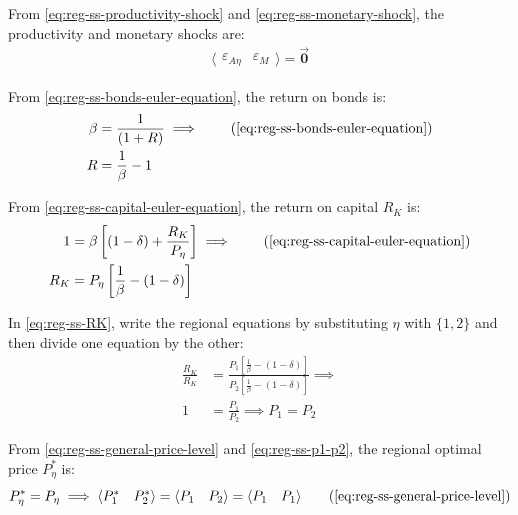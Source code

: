 \documentclass[
thesis.tex
]{subfiles}
\begin{document}
	From \ref{eq:reg-ss-productivity-shock} and \ref{eq:reg-ss-monetary-shock}, the productivity and monetary shocks are:
	\begin{align}
		\langle \begin{matrix} \varepsilon_{A\eta} & \varepsilon_{M} \end{matrix} \rangle = \vec{\bm{0}} \label{eq:reg-ss-epsilon}
	\end{align}
	
	From \ref{eq:reg-ss-bonds-euler-equation}, the return on bonds is:
	\begin{align}
		\beta &= \frac{1}{(1 + R)} \implies \tag{\ref{eq:reg-ss-bonds-euler-equation}} \\
		R &= \frac{1}{\beta} - 1 \label{eq:reg-ss-R}
	\end{align}
	
	From \ref{eq:reg-ss-capital-euler-equation}, the return on capital $R_K$ is:
	\begin{align}
		1 &= \beta \left[ (1-\delta) + \frac{R_K}{P_{\eta}} \right] \implies \tag{\ref{eq:reg-ss-capital-euler-equation}} \\
		R_K &= P_{\eta} \left[ \frac{1}{\beta} - (1-\delta) \right] \label{eq:reg-ss-RK}
	\end{align}

	In \ref{eq:reg-ss-RK}, write the regional equations by substituting $\eta$ with $\{1,2\}$ and then divide one equation by the other:
	\begin{align}
		\frac{R_K}{R_K} &= \frac{P_{1} \left[ \frac{1}{\beta} - (1-\delta) \right]}{P_{2} \left[ \frac{1}{\beta} - (1-\delta) \right]} \implies \nonumber \\
		1 &= \frac{P_{1}}{P_{2}} \implies P_{1} = P_{2} \label{eq:reg-ss-p1-p2}
	\end{align}

From \ref{eq:reg-ss-general-price-level} and \ref{eq:reg-ss-p1-p2}, the regional optimal price $P_{\eta}^{\ast}$ is:
\begin{align}
	P_{\eta}^{\ast} = P_{\eta} \implies \langle \begin{matrix} P_{1}^{\ast} & P_{2}^{\ast} \end{matrix} \rangle = \langle \begin{matrix} P_{1} & P_{2} \end{matrix} \rangle = \langle \begin{matrix} P_{1} & P_{1} \end{matrix} \rangle \tag{\ref{eq:reg-ss-general-price-level}}
\end{align}
\end{document}
